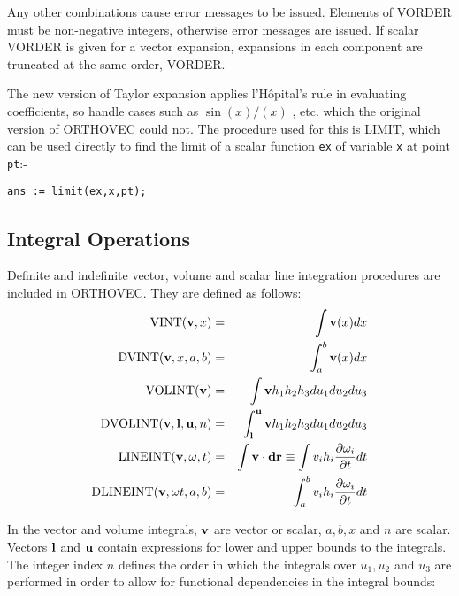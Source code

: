 Any other combinations cause error messages to be issued.  Elements of
VORDER must be non-negative integers, otherwise error messages are
issued.  If scalar VORDER is given for a vector expansion, expansions
in each component are truncated at the same order, VORDER.

The new version of Taylor expansion applies 
l'H\^opital's rule in evaluating coefficients, so handle cases such as
$\sin(x) / (x) $ , etc.  which the original version of ORTHOVEC could
not. The procedure used for this is LIMIT,  which can
be used directly to find the limit of a scalar function {\tt ex} of
variable {\tt x} at point {\tt pt}:-

\begin{verbatim}
ans := limit(ex,x,pt);
\end{verbatim}

\subsection{Integral Operations}
Definite and indefinite vector, volume and scalar line integration
procedures are included in ORTHOVEC.  They are defined as follows:
 
   
\begin{eqnarray*}
{\rm VINT} ({\bf v},x) & = & \int {\bf v}(x)dx\\
%
{\rm DVINT} ({\bf v},x, a, b) & = & \int^b_a {\bf v} (x) dx\\
%
{\rm VOLINT} ({\bf v}) & = & \int {\bf v} h_1 h_2 h_3 du_1 du_2 du_3\\
%
{\rm DVOLINT}({\bf v},{\bf l},{\bf u},n) & = & \int^{\bf u}_{\bf l}
{\bf v} h_1 h_2 h_3 du_1 du_2 du_3\\
%
{\rm LINEINT} ({\bf v, \omega}, t) & = & \int {\bf v} \cdot {\bf dr}
\equiv \int v_i h_i \frac{\partial \omega_i}{\partial t} dt\\
%
{\rm DLINEINT} ({\bf v, \omega} t, a, b) & = & \int^b_a v_i h_i
\frac{\partial \omega_i}{\partial t} dt\\
\end{eqnarray*}

In the vector and volume integrals, ${\bf v}$ are vector or scalar,
$a, b,x$ and $n$ are scalar.  Vectors ${\bf l}$ and ${\bf u}$ contain
expressions for lower and upper bounds to the integrals.  The integer
index $n$ defines the order in which the integrals over $u_1, u_2$ and
$u_3$ are performed in order to allow for functional dependencies in
the integral bounds:

